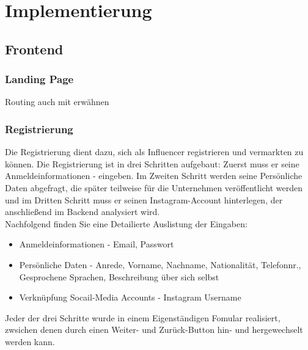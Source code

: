 \documentclass[conference,a4paper,flushend]{cs-techrep}
\begin{document}
\section{Implementierung}
\subsection{Frontend}

\subsubsection{Landing Page\\}
 Routing auch mit erwähnen

\subsubsection{Registrierung\\}
Die Registrierung dient dazu, sich als Influencer registrieren und vermarkten zu können. Die Registrierung ist in drei Schritten aufgebaut:
Zuerst muss er seine Anmeldeinformationen - eingeben. Im Zweiten Schritt werden seine Persönliche Daten abgefragt, die später teilweise für die Unternehmen veröffentlicht werden und im Dritten Schritt muss er seinen Instagram-Account hinterlegen, der anschließend im Backend analysiert wird.\\
Nachfolgend finden Sie eine Detailierte Auslistung der Eingaben:
\begin{itemize}
\item{Anmeldeinformationen - Email, Passwort}
\item{Persönliche Daten - Anrede, Vorname, Nachname, Nationalität, Telefonnr., Gesprochene Sprachen, Beschreibung über sich selbst}
\item{Verknüpfung Socail-Media Accounts - Instagram Username}
\end{itemize}
Jeder der drei Schritte wurde in einem Eigenständigen Fomular realisiert, zwsichen denen durch einen Weiter- und Zurück-Button hin- und hergewechselt werden kann.
\end{document}
